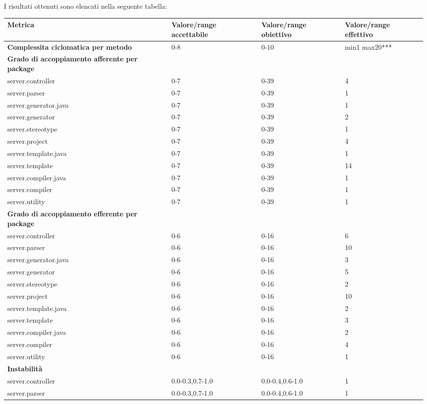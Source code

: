 		I risultati ottenuti sono elencati nella seguente tabella:
		\begin{longtable}{|p{5.5cm}|p{2.25cm}|p{2.25cm}|p{2.25cm}|}
		\hline
		\textbf{Metrica} &\textbf{Valore/range accettabile}	&\textbf{Valore/range obiettivo}	&\textbf{Valore/range effettivo}\\
		\hline
		\textbf{Complessita ciclomatica per metodo} &0-8 &0-10 &min1 max20***\\
		\hline
		\textbf{Grado di accoppiamento afferente per package} & & &\\
		server.controller &0-7 &0-39 &4\\
		server.parser  &0-7 &0-39 &1\\
		server.generator.java  &0-7 &0-39 &1\\
		server.generator &0-7 &0-39 &2\\
		server.stereotype  &0-7 &0-39 &1\\
		server.project  &0-7 &0-39 &4\\
		server.template.java  &0-7 &0-39 &1\\
		server.template  &0-7 &0-39 &14\\
		server.compiler.java  &0-7 &0-39 &1\\
		server.compiler  &0-7 &0-39 &1\\
		server.utility  &0-7 &0-39 &1\\
		\hline
		\textbf{Grado di accoppiamento efferente per package} & & &\\
		server.controller &0-6 &0-16 &6\\
		server.parser &0-6 &0-16 &10\\
		server.generator.java &0-6 &0-16 &3\\
		server.generator &0-6 &0-16 &5\\
		server.stereotype &0-6 &0-16 &2\\
		server.project &0-6 &0-16 &10\\
		server.template.java &0-6 &0-16 &2\\
		server.template &0-6 &0-16 &3\\
		server.compiler.java &0-6 &0-16 &2\\
		server.compiler &0-6 &0-16 &4\\
		server.utility &0-6 &0-16 &1\\
		\hline
		\textbf{Instabilità} & & &\\
		server.controller &0.0-0.3,0.7-1.0 &0.0-0.4,0.6-1.0 &1\\
		server.parser &0.0-0.3,0.7-1.0 &0.0-0.4,0.6-1.0 &1\\

\end{longtable}
